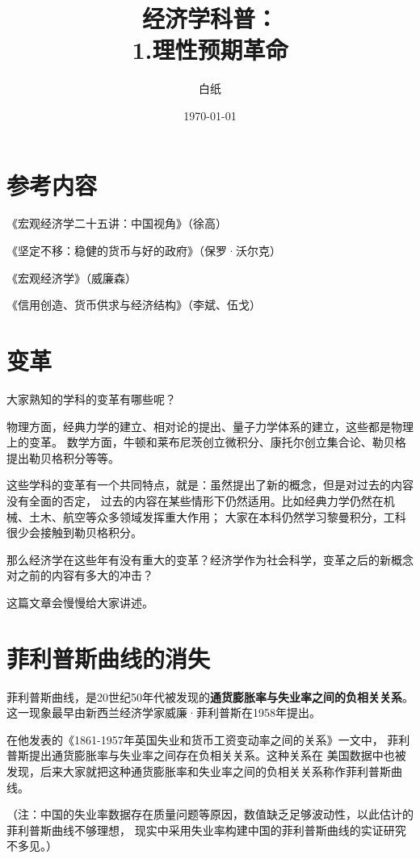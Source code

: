 \documentclass[UTF8]{article}
\title{经济学科普： \\ 1.理性预期革命}
\author{白纸}
\date{\today}
\begin{document}
\maketitle

\section{参考内容}
    《宏观经济学二十五讲：中国视角》（徐高）\par
    《坚定不移：稳健的货币与好的政府》（保罗·沃尔克）\par
    《宏观经济学》（威廉森）\par
    《信用创造、货币供求与经济结构》（李斌、伍戈）

\section{变革}
    大家熟知的学科的变革有哪些呢？\par
    物理方面，经典力学的建立、相对论的提出、量子力学体系的建立，这些都是物理上的变革。
    数学方面，牛顿和莱布尼茨创立微积分、康托尔创立集合论、勒贝格提出勒贝格积分等等。\par
    这些学科的变革有一个共同特点，就是：虽然提出了新的概念，但是对过去的内容没有全面的否定，
    过去的内容在某些情形下仍然适用。比如经典力学仍然在机械、土木、航空等众多领域发挥重大作用；
    大家在本科仍然学习黎曼积分，工科很少会接触到勒贝格积分。\par
    那么经济学在这些年有没有重大的变革？经济学作为社会科学，变革之后的新概念对之前的内容有多大的冲击？\par
    这篇文章会慢慢给大家讲述。

\section{菲利普斯曲线的消失}
    菲利普斯曲线，是20世纪50年代被发现的\textbf{通货膨胀率与失业率之间的负相关关系}。
    这一现象最早由新西兰经济学家威廉·菲利普斯在1958年提出。\par
    在他发表的《1861-1957年英国失业和货币工资变动率之间的关系》一文中，
    菲利普斯提出通货膨胀率与失业率之间存在负相关关系。这种关系在
    美国数据中也被发现，后来大家就把这种通货膨胀率和失业率之间的负相关关系称作菲利普斯曲线。\par
    （注：中国的失业率数据存在质量问题等原因，数值缺乏足够波动性，以此估计的菲利普斯曲线不够理想，
    现实中采用失业率构建中国的菲利普斯曲线的实证研究不多见。）\par
    
\end{document}

